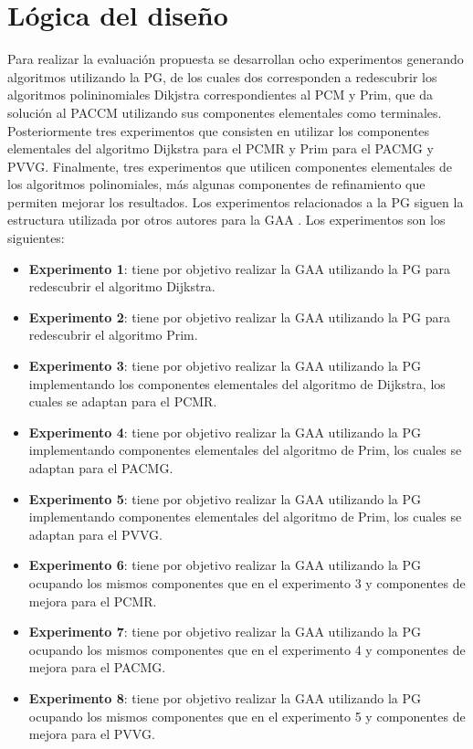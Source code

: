 
\section{Lógica del diseño}\label{cap:logica_diseno}

Para realizar la evaluación propuesta se desarrollan ocho experimentos generando algoritmos utilizando la PG, de los cuales dos corresponden a redescubrir los algoritmos polininomiales Dikjstra correspondientes al PCM  y Prim, que da solución al PACCM utilizando sus componentes elementales como terminales. Posteriormente tres experimentos que consisten en utilizar los componentes elementales del algoritmo Dijkstra para el PCMR y  Prim para el PACMG y PVVG. Finalmente, tres experimentos que utilicen componentes elementales de los algoritmos polinomiales, más algunas componentes de refinamiento que permiten mejorar los resultados. Los experimentos relacionados a la PG siguen la estructura utilizada por otros autores para la GAA \citep{contreras_2013, drake_2014,parada_2015}. Los experimentos son los siguientes:

\begin{itemize}
  \item \textbf{Experimento 1}: tiene por objetivo realizar la GAA utilizando la PG para redescubrir el algoritmo Dijkstra.
  \item \textbf{Experimento 2}: tiene por objetivo realizar la GAA utilizando la PG para redescubrir el algoritmo Prim.
  \item \textbf{Experimento 3}: tiene por objetivo realizar la GAA utilizando la PG implementando los componentes elementales del algoritmo de Dijkstra, los cuales se adaptan para el PCMR.
  \item \textbf{Experimento 4}: tiene por objetivo realizar la GAA utilizando la PG implementando componentes elementales del algoritmo de Prim, los cuales se adaptan para el PACMG.
  \item \textbf{Experimento 5}: tiene por objetivo realizar la GAA utilizando la PG implementando componentes elementales del algoritmo de Prim, los cuales se adaptan para el PVVG.
  \item \textbf{Experimento 6}: tiene por objetivo realizar la GAA utilizando la PG ocupando los mismos componentes que en el experimento 3 y componentes de mejora para el PCMR.
  \item \textbf{Experimento 7}: tiene por objetivo realizar la GAA utilizando la PG ocupando los mismos componentes que en el experimento 4 y componentes de mejora para el PACMG.
  \item \textbf{Experimento 8}: tiene por objetivo realizar la GAA utilizando la PG ocupando los mismos componentes que en el experimento 5 y componentes de mejora para el PVVG.

\end{itemize}

